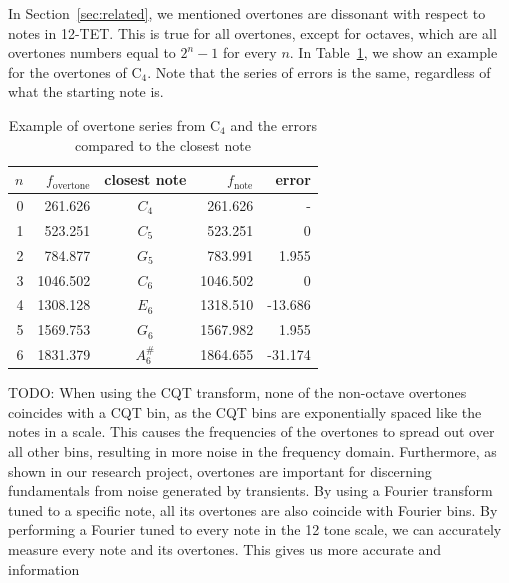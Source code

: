 \documentclass[10pt,twocolumn]{article}
\newcommand{\note}[2]{#1${}_{#2}$}
\begin{document}
In Section~\ref{sec:related}, we mentioned overtones are dissonant with respect to notes in 12-TET. This is true for all overtones, except for octaves, which are all overtones numbers equal to $2^n - 1$ for every $n$. In Table~\ref{tab:overseries}, we show an example for the overtones of \note{C}{4}. Note that the series of errors is the same, regardless of what the starting note is.
\begin{table}[H]
    \centering
    \begin{tabular}{rrcrr}
        $n$ & $f_{\text{overtone}}$ & closest note & $f_\text{note}$ & error \\
        \hline
        0 & 261.626  & $C_4$    & 261.626  &  - \\
        1 & 523.251  & $C_5$    & 523.251  &  0 \\
        2 & 784.877  & $G_5$    & 783.991  &  1.955 \\
        3 & 1046.502 & $C_6$    & 1046.502 &  0 \\
        4 & 1308.128 & $E_6$    & 1318.510 &  -13.686 \\
        5 & 1569.753 & $G_6$    & 1567.982 &  1.955 \\
        6 & 1831.379 & $A^\#_6$ & 1864.655 &  -31.174
    \end{tabular}
    \caption{Example of overtone series from \note{C}{4} and the errors compared to the closest note}
    \label{tab:overseries}
\end{table}
TODO: When using the CQT transform, none of the non-octave overtones coincides with a CQT bin, as the CQT bins are exponentially spaced like the notes in a scale. This causes the frequencies of the overtones to spread out over all other bins, resulting in more noise in the frequency domain. Furthermore, as shown in our research project, overtones are important for discerning fundamentals from noise generated by transients. By using a Fourier transform tuned to a specific note, all its overtones are also coincide with Fourier bins. By performing a Fourier tuned to every note in the 12 tone scale, we can accurately measure every note and its overtones. This gives us more accurate and information
\end{document}

